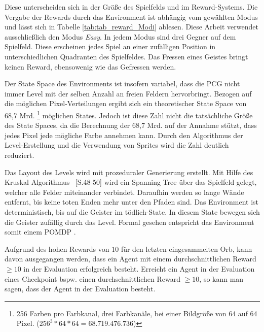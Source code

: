 Diese unterscheiden sich in der Größe des Spielfelds und im Reward-Systems. Die Vergabe der Rewards durch das Environment ist abhängig vom gewählten Modus und lässt sich in Tabelle \ref{tab:tab_reward_Modi} ablesen. Diese Arbeit verwendet ausschließlich den Modus \emph{Easy}. In jedem Modus sind drei Gegner auf dem Spielfeld. Diese erscheinen jedes Spiel an einer zufälligen Position in unterschiedlichen Quadranten des Spielfeldes. Das Fressen eines Geistes bringt keinen Reward, ebensowenig wie das Gefressen werden.

Der State Space des Environments ist insofern variabel, dass die PCG nicht immer Level mit der selben Anzahl an freien Feldern hervorbringt. Bezogen auf die möglichen Pixel-Verteilungen ergibt sich ein theoretischer State Space von 68,7 Mrd. \footnote{256 Farben pro Farbkanal, drei Farbkanäle, bei einer Bildgröße von 64 auf 64 Pixel. ($256^3 * 64 * 64 = 68.719.476.736$)} möglichen States. Jedoch ist diese Zahl nicht die tatsächliche Größe des State Spaces, da die Berechnung der 68,7 Mrd. auf der Annahme stützt, dass jedes Pixel jede mögliche Farbe annehmen kann. Durch den Algorithmus der Level-Erstellung und die Verwendung von Sprites wird die Zahl deutlich reduziert. 

Das Layout des Levels wird mit prozeduraler Generierung erstellt. Mit Hilfe des Kruskal Algorithmus \cite{kruskal1956shortest}~[S.48-50] wird ein Spanning Tree über das Spielfeld gelegt, welcher alle Felder miteinander verbindet. Daraufhin werden so lange Wände entfernt, bis keine toten Enden mehr unter den Pfaden sind. Das Environment ist deterministisch, bis auf die Geister im tödlich-State. In diesem State bewegen sich die Geister zufällig durch das Level. Formal gesehen entspricht das Environment somit einem POMDP \cite{astrom1965optimal}.

Aufgrund des hohen Rewards von $10$ für den letzten eingesammelten Orb, kann davon ausgegangen werden, dass ein Agent mit einem durchschnittlichen Reward $ \geq 10$ in der Evaluation erfolgreich besteht. Erreicht ein Agent in der Evaluation eines Checkpoint bspw. einen durchschnittlichen Reward $\geq 10$, so kann man sagen, dass der Agent in der Evaluation besteht. 





\newpage